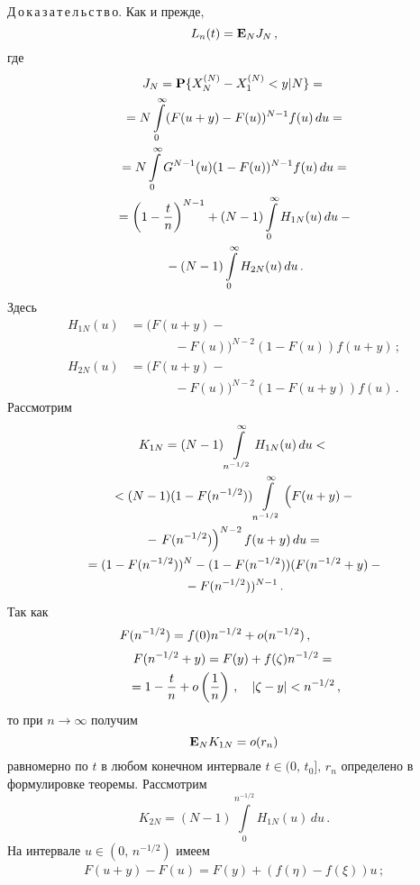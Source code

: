 \begin{multicols}{2}
\noindent
{Д\,о\,к\,а\,з\,а\,т\,е\,л\,ь\,с\,т\,в\,о.} Как и прежде, 
\begin{equation}
L_n(t)={\bf E}_NJ_N\,, 
\label{16}
\end{equation} 
где 
\begin{multline}
J_N={\bf P}\{X_N^{(N)}-X_1^{(N)}<y|N\}={}\\
{}=N\int\limits_{0}^{\infty}(F(u+y)-F(u))^{N-1}f(u)\,du={}\\
{}=
N\int\limits_{0}^{\infty}G^{N-1}(u)(1-F(u))^{N-1}f(u)\,du={}\\
{}=\left(1-\displaystyle\frac{\displaystyle t\mathstrut}{\displaystyle n\mathstrut}\right)^{N-1}+
(N-1)\int\limits_{0}^{\infty}H_{1N}(u)\,du-{}\\
{}-(N-1)\int\limits_{0}^{\infty}H_{2N}(u)\,du\,.
\label{17}
\end{multline} 
Здесь
\begin{align*}
H_{1N}(u)&=(F(u+y)-{}\\
&\ \ \ \ \ \ \ \ \ \ \ \ \ \ \ \ {}- F(u))^{N-2}(1-F(u))f(u+y)\,;\\
H_{2N}(u)&=(F(u+y)-{}\\
&\ \ \ \ \ \ \ \ \ \ \ \ \ \ \ \ {}-F(u))^{N-2}(1-F(u+y))f(u)\,. 
\end{align*} 
Рассмотрим
\begin{multline*}
K_{1N}=(N-1)\int\limits_{n^{-1/2}}^{\infty}H_{1N}(u)\,du<{}\\
{}<(N-1)
(1-F(n^{-1/2}))\int\limits_{n^{-1/2}}^{\infty}
\left (\vphantom{\left. F(n^{-1/2})\right )}F(u+y)-{}\right.\\
{}-\left. F(n^{-1/2})\right )^{N-2}f(u+y)\,du={}\\
{}=(1-F(n^{-1/2}))^{N}-(1-F(n^{-1/2}))(F(n^{-1/2}+y)-{}\\
{}-F(n^{-1/2}))^{N-1}\,.
\end{multline*}
Так как 
$$
F(n^{-1/2})=f(0)n^{-1/2}+o(n^{-1/2})\,,\hspace*{30pt}
$$
\begin{multline*}
F(n^{-1/2}+y)=F(y)+f(\zeta)n^{-1/2}={}\\
{}=1-\displaystyle\frac{\displaystyle t\mathstrut}{\displaystyle n\mathstrut}+o\left(\displaystyle\frac{\displaystyle 1\mathstrut}{\displaystyle n\mathstrut}\right)\,,
\quad |\zeta-y|<n^{-1/2}\,, 
\end{multline*} 
то при $n \to \infty$ получим 
$$
{\bf E}_NK_{1N}=o(r_n)
$$ 
равномерно по $t$ в любом конечном интервале
$t\in(0,\,t_0], \, r_n$ определено в формулировке теоремы.
Рассмотрим 
$$
K_{2N}=(N-1)\int\limits_{0}^{n^{-1/2}}H_{1N}(u)\,du\,.
$$ 
На интервале $u\in(0,\,n^{-1/2})$ имеем
\begin{gather*}
F(u+y)-F(u)=F(y)+(f(\eta)-f(\xi))u\,; \\ 

\end{gather*}
\end{multicols}
